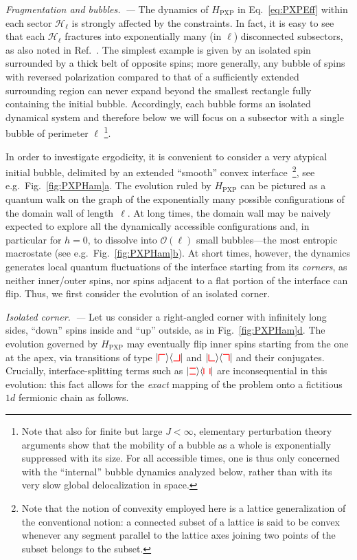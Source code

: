 \documentclass[reprint,aps,prl,superscriptaddress,english,nolongbibliography]{revtex4-2}
\newcommand{\sbra}[1]{\langle #1 |}
\newcommand{\sket}[1]{| #1 \rangle}
\newcommand{\urmove}[0]{%
\begin{tikzpicture}[baseline=0.1ex]%
\draw[thick, red] (0,1.5ex) -- (1.5ex,1.5ex);%
\draw[thick, red] (1.5ex,1.5ex) -- (1.5ex,0);%
\end{tikzpicture}%
}
\newcommand{\ulmove}[0]{%
\begin{tikzpicture}[baseline=0.1ex]%
\draw[thick, red] (0,1.5ex) -- (1.5ex,1.5ex);%
\draw[thick, red] (0,1.5ex) -- (0,0);%
\end{tikzpicture}%
}
\newcommand{\dlmove}[0]{%
\begin{tikzpicture}[baseline=0.1ex]%
\draw[thick, red] (0,1.5ex) -- (0,0);%
\draw[thick, red] (0,0) -- (1.5ex,0);%
\end{tikzpicture}%
}
\newcommand{\drmove}[0]{%
\begin{tikzpicture}[baseline=0.1ex]%
\draw[thick, red] (0,0) -- (1.5ex,0);%
\draw[thick, red] (1.5ex,1.5ex) -- (1.5ex,0ex);%
\end{tikzpicture}%
}
\newcommand{\vvmove}[0]{%
\begin{tikzpicture}[baseline=0.1ex]%
\draw[thick, red] (0,0) -- (0,1.5ex);%
\draw[thick, red] (1.5ex,0) -- (1.5ex,1.5ex);%
\end{tikzpicture}%
}
\newcommand{\hhmove}[0]{%
\begin{tikzpicture}[baseline=0.1ex]%
\draw[thick, red] (0,0) -- (1.5ex,0);%
\draw[thick, red] (1.5ex,1.5ex) -- (0,1.5ex);%
\end{tikzpicture}%
}
\begin{document}
\emph{Fragmentation and bubbles.~---} The dynamics of $H_{\mathrm{PXP}}$ in Eq.~\eqref{eq:PXPEff} within each sector $\mathcal{H}_\ell$ is strongly affected by the constraints. In fact, it is easy to see that each $\mathcal{H}_\ell$ fractures into exponentially many (in $\ell$) disconnected subsectors, as also noted in Ref.~\cite{Yoshinaga2021Emergence}. The simplest example is given by an isolated spin surrounded by a thick belt of opposite spins; more generally, any bubble of spins with reversed polarization compared to that of a sufficiently extended surrounding region can never expand beyond the smallest rectangle fully containing the initial bubble. Accordingly, each bubble forms an isolated dynamical system and therefore below we will focus on a subsector with a single bubble of perimeter $\ell$ \footnote{Note that also for finite but large $J<\infty$, elementary perturbation theory arguments show that the mobility of a bubble as a whole is exponentially suppressed with its size. For all accessible times, one is thus only concerned with the ``internal'' bubble dynamics analyzed below, rather than with its very slow global delocalization in space.}.  

In order to investigate ergodicity, it is convenient to consider a very atypical initial bubble, delimited by an extended ``smooth'' convex interface~\footnote{Note that the notion of convexity employed here is a lattice generalization of the conventional notion: a connected subset of a lattice is said to be convex whenever any segment parallel to the lattice axes joining two points of the subset belongs to the subset.}, see e.g.\ Fig.~\hyperref[fig:PXPHam]{\ref{fig:PXPHam}a}. The evolution ruled by $H_{\mathrm{PXP}}$ can be pictured as a quantum walk on the graph of the exponentially many possible configurations of the domain wall of length~$\ell$. At long times, the domain wall may be naively expected to explore all the dynamically accessible configurations and, in particular for $h=0$, to dissolve into $\mathcal{O}(\ell)$ small bubbles---the most entropic macrostate (see e.g.\ Fig.~\hyperref[fig:PXPHam]{\ref{fig:PXPHam}b}). At short times, however, the dynamics generates local quantum fluctuations of the interface starting from its \emph{corners}, as neither inner/outer spins, nor spins adjacent to a flat portion of the interface can flip. Thus, we first consider the evolution of an isolated corner. 


\emph{Isolated corner.~---} Let us consider a right-angled corner with infinitely long sides, ``down'' spins inside and ``up'' outside, as in Fig.~\hyperref[fig:PXPHam]{\ref{fig:PXPHam}d}. The evolution governed by $H_{\mathrm{PXP}}$ may eventually flip inner spins starting from the one at the apex, via transitions of type $\sket{\ulmove}\sbra{\drmove}$ and $\sket{\dlmove}\sbra{\urmove}$ and their conjugates. Crucially, interface-splitting terms such as $\sket{\hhmove}\sbra{\vvmove}$ are inconsequential in this evolution: this fact allows for the \emph{exact} mapping of the problem onto a fictitious $1d$ fermionic chain as follows.
\end{document}
